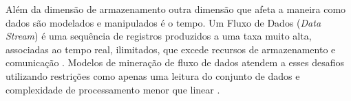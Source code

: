Além da dimensão de armazenamento outra dimensão que afeta a maneira como dados
são modelados e manipulados é o tempo. Um Fluxo de Dados (\emph{Data Stream}) é
uma sequência de registros produzidos a uma taxa muito alta, associadas ao tempo
real, ilimitados, que excede recursos de armazenamento e comunicação \cite{Gaber2005}.
Modelos de mineração de fluxo de dados atendem a esses desafios utilizando
restrições como apenas uma leitura do conjunto de dados e complexidade
de processamento menor que linear \cite{Gama2007, Gaber2005}.

 



% 
% 


